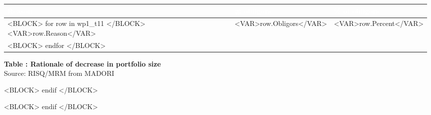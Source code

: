 \documentclass[10pt, a4paper]{article}
\newcounter{tableCounter}
\begin{document}
\vspace{0.3cm}
\noindent\begin{tabularx}{\textwidth}{|X|>{\centering\arraybackslash}p{3cm}|>{\centering\arraybackslash}p{3cm}|}
\hline
\rowcolor{sgred}
\centering\textcolor{white}{\textbf{Reason}} & \centering\textcolor{white}{\textbf{\# obligors}} & \centering\arraybackslash\textcolor{white}{\textbf{\% of obligors}} \\
\hline
<BLOCK> for row in wp1_t11 </BLOCK>
<VAR>row.Reason</VAR> & \centering<VAR>row.Obligors</VAR> & \centering\arraybackslash<VAR>row.Percent</VAR> \\
\hline
<BLOCK> endfor </BLOCK>
\end{tabularx}
\begin{center}
\scriptsize \textbf{Table \thetableCounter: Rationale of decrease in portfolio size} \\
Source: RISQ/MRM from MADORI
\end{center}
<BLOCK> endif </BLOCK>

<BLOCK> endif </BLOCK>
\end{document}
